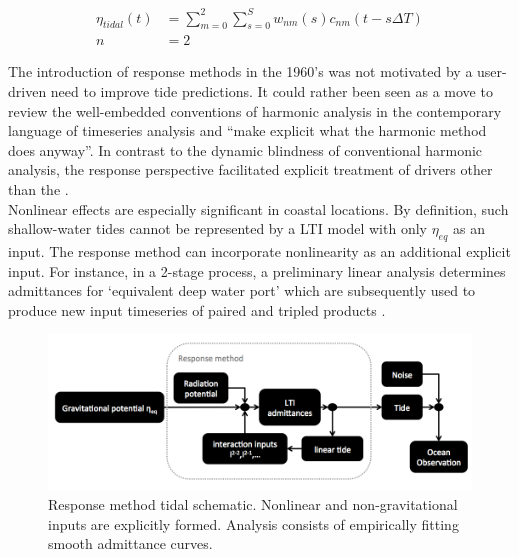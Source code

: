 \begin{align}
\label{E:lags}
\eta_{tidal}(t) &= \sum_{m=0}^{2}\sum_{s=0}^{S} w_{nm}(s)c_{nm}(t-s\Delta T)\\
              n &= 2   \nonumber
\end{align}

The introduction of response methods in the 1960's was not motivated by a user-driven need to improve tide predictions.  It could rather been seen as a move to review the well-embedded conventions of harmonic analysis in the contemporary language of timeseries analysis and ``make explicit what the harmonic method does anyway''\citep[pp 540]{Munk:1966ts}.  In contrast to the dynamic blindness of conventional harmonic analysis, the response perspective facilitated explicit treatment of drivers other than the \ATGP{}.\\

Nonlinear effects are especially significant in coastal locations.   By definition, such shallow-water tides cannot be represented by a LTI model with only $\eta_{eq}$ as an input.  The response method can incorporate nonlinearity as an additional explicit input.    For instance,  in a 2-stage process, a preliminary linear analysis determines admittances for `equivalent deep water port' which are subsequently used to produce new input timeseries of paired and tripled products \citep[pp 122]{Pugh:1996uz}.\\

\begin{figure}[h]
\begin{center}
\includegraphics[width=\figwidthBig]{figures/diagrams/response_analysis_flowchart.png}
\caption{Response method tidal schematic.  Nonlinear and non-gravitational inputs are explicitly formed.   Analysis consists of empirically fitting smooth admittance curves.}
\label{fig:response}
\end{center}
\end{figure}

